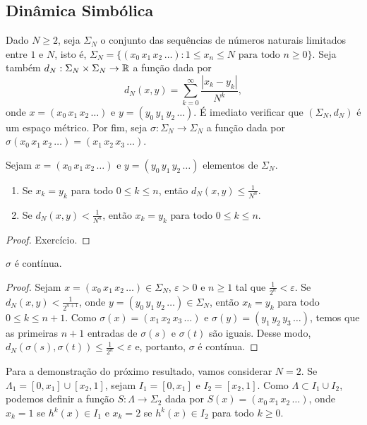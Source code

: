 \subsection{Dinâmica Simbólica}

Dado $N \geq 2$, seja $\Sigma_N$ o conjunto das sequências de números naturais limitados entre $1$ e $N$, isto é, $\Sigma_N = \lbrace (x_0 \, x_1 \, x_2 \, \dots) : 1 \leq x_n \leq N  \text{ para todo } n \geq 0 \rbrace$.
Seja também $d_N : \Sigma_N \times \Sigma_N \to \mathbb{R}$ a função dada por
$$d_N(x, y) = \sum_{k=0}^\infty \frac{|x_k - y_k|}{N^k},$$
onde $x = (x_0 \, x_1 \, x_2 \, \dots)$ e $y = (y_0 \, y_1 \, y_2 \, \dots)$.
É imediato verificar que $(\Sigma_N, d_N)$ é um espaço métrico.
Por fim, seja $\sigma: \Sigma_N \to \Sigma_N$ a função dada por $\sigma(x_0 \, x_1 \, x_2 \, \dots) = (x_1 \, x_2 \, x_3 \, \dots)$.

\begin{proposition}
Sejam $x = (x_0 \, x_1 \, x_2 \, \dots)$ e $y = (y_0 \, y_1 \, y_2 \, \dots)$ elementos de $\Sigma_N$.
\begin{enumerate}
\item Se $x_k = y_k$ para todo $0 \leq k \leq n$, então $d_N(x, y) \leq \frac{1}{N^n}$.
\item Se $d_N(x, y) < \frac{1}{N^n}$, então $x_k = y_k$ para todo $0 \leq k \leq n$.
\end{enumerate}
\end{proposition}

\begin{proof}
Exercício.
\end{proof}

\begin{proposition}
$\sigma$ é contínua.
\end{proposition}

\begin{proof}
Sejam $x = (x_0 \, x_1 \, x_2 \, \dots) \in \Sigma_N$, $\varepsilon > 0$ e $n \geq 1$ tal que $\frac{1}{2^n} < \varepsilon$.
Se $d_N(x, y) < \frac{1}{2^{n+1}}$, onde $y = (y_0 \, y_1 \, y_2 \, \dots) \in \Sigma_N$, então $x_k = y_k$ para todo $0 \leq k \leq n+1$.
Como $\sigma(x) = (x_1 \, x_2 \, x_3  \, \dots)$ e $\sigma(y) = (y_1 \, y_2 \, y_3 \, \dots)$, temos que as primeiras $n+1$ entradas de $\sigma(s)$ e $\sigma(t)$ são iguais. Desse modo,  $d_N(\sigma(s), \sigma(t)) \leq \frac{1}{2^n} < \varepsilon$ e, portanto, $\sigma$ é contínua.
\end{proof}

Para a demonstração do próximo resultado, vamos considerar $N = 2$.
Se $\Lambda_1 = [0, x_1] \cup [x_2, 1]$, sejam $I_1 = [0, x_1]$ e $I_2 = [x_2, 1]$.
Como $\Lambda \subset I_1 \cup I_2$, podemos definir a função $S: \Lambda \to \Sigma_2$ dada por $S(x) = (x_0 \, x_1 \, x_2 \, \dots)$, onde $x_k = 1$ se $h^k(x) \in I_1$ e $x_k = 2$ se $h^k(x) \in I_2$ para todo $k \geq 0$.

